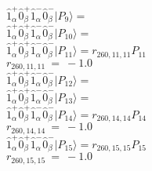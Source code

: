 \documentclass[14pt]{article}
\begin{document}
    $ \hat{1}_{\alpha}^{+}\hat{0}_{\beta}^{+}\hat{1}_{\alpha}^{-}\hat{0}_{\beta}^{-} \vert{P_{9}}\rangle =  $ \\ 
    $ \hat{1}_{\alpha}^{+}\hat{0}_{\beta}^{+}\hat{1}_{\alpha}^{-}\hat{0}_{\beta}^{-} \vert{P_{10}}\rangle =  $ \\ 
    $ \hat{1}_{\alpha}^{+}\hat{0}_{\beta}^{+}\hat{1}_{\alpha}^{-}\hat{0}_{\beta}^{-} \vert{P_{11}}\rangle = {r}_{260,11,11}P_{11} $ \\ 
    ${r}_{260,11,11}\ =\ -1.0 $ \\ 
    $ \hat{1}_{\alpha}^{+}\hat{0}_{\beta}^{+}\hat{1}_{\alpha}^{-}\hat{0}_{\beta}^{-} \vert{P_{12}}\rangle =  $ \\ 
    $ \hat{1}_{\alpha}^{+}\hat{0}_{\beta}^{+}\hat{1}_{\alpha}^{-}\hat{0}_{\beta}^{-} \vert{P_{13}}\rangle =  $ \\ 
    $ \hat{1}_{\alpha}^{+}\hat{0}_{\beta}^{+}\hat{1}_{\alpha}^{-}\hat{0}_{\beta}^{-} \vert{P_{14}}\rangle = {r}_{260,14,14}P_{14} $ \\ 
    ${r}_{260,14,14}\ =\ -1.0 $ \\ 
    $ \hat{1}_{\alpha}^{+}\hat{0}_{\beta}^{+}\hat{1}_{\alpha}^{-}\hat{0}_{\beta}^{-} \vert{P_{15}}\rangle = {r}_{260,15,15}P_{15} $ \\ 
    ${r}_{260,15,15}\ =\ -1.0 $ \\ 
    
\end{document}
